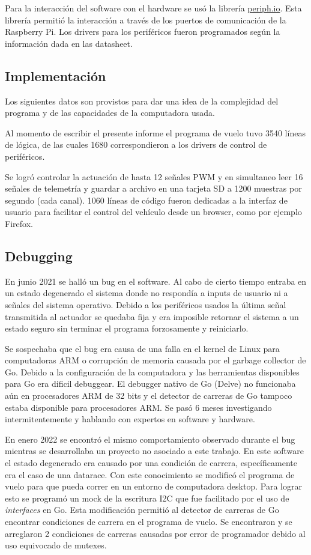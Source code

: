 Para la interacción del software con el hardware se usó la librería \href{https://periph.io}{periph.io}. Esta librería permitió la interacción a través de los puertos de comunicación de la Raspberry Pi. Los drivers para los periféricos fueron programados según la información dada en las datasheet.


\subsection{Implementación}

Los siguientes datos son provistos para dar una idea de la complejidad del programa y de las capacidades de la computadora usada.

Al momento de escribir el presente informe el programa de vuelo tuvo 3540 líneas de lógica, de las cuales 1680 correspondieron a los drivers de control de periféricos.

Se logró controlar la actuación de hasta 12 señales PWM y en simultaneo leer 16 señales de telemetría y guardar a archivo en una tarjeta SD a 1200 muestras por segundo (cada canal). 1060 líneas de código fueron dedicadas a la interfaz de usuario para facilitar el control del vehículo desde un browser, como por ejemplo Firefox.

\subsection{Debugging}

En junio 2021 se halló un bug en el software. Al cabo de cierto tiempo entraba en un estado degenerado el sistema donde no respondía a inputs de usuario ni a señales del sistema operativo. Debido a los periféricos usados la última señal transmitida al actuador se quedaba fija y era imposible retornar el sistema a un estado seguro sin terminar el programa forzosamente y reiniciarlo. 

Se sospechaba que el bug era causa de una falla en el kernel de Linux para computadoras ARM o corrupción de memoria causada por el garbage collector de Go. Debido a la configuración de la computadora y las herramientas disponibles para Go era dificil debuggear. El debugger nativo de Go (Delve) no funcionaba aún en procesadores ARM de 32 bits y el detector de carreras de Go tampoco estaba disponible para procesadores ARM. Se pasó 6 meses investigando intermitentemente y hablando con expertos en software y hardware.

En enero 2022 se encontró el mismo comportamiento observado durante el bug mientras se desarrollaba un proyecto no asociado a este trabajo. En este software el estado degenerado era causado por una condición de carrera, específicamente era el caso de una \gls{datarace}. Con este conocimiento se modificó el programa de vuelo para que pueda correr en un entorno de computadora desktop. Para lograr esto se programó un mock de la escritura I2C que fue facilitado por el uso de \textit{interfaces} en Go. Esta modificación permitió al detector de carreras de Go encontrar condiciones de carrera en el programa de vuelo. Se encontraron y se arreglaron 2 condiciones de carreras causadas por error de programador debido al uso equivocado de mutexes.

